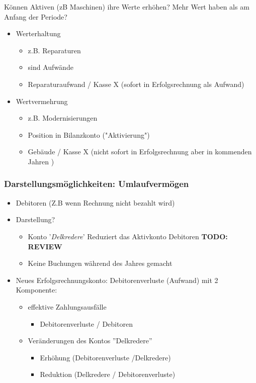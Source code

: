 Können Aktiven (zB Maschinen) ihre Werte erhöhen? Mehr Wert haben als am Anfang der Periode?
\begin{itemize}
    \item Werterhaltung
    \begin{itemize}
        \item z.B. Reparaturen
        \item sind Aufwände
        \item Reparaturaufwand / Kasse X (sofort in Erfolgsrechnung als Aufwand)
    \end{itemize}
    \item Wertvermehrung
    \begin{itemize}
        \item z.B. Modernisierungen
        \item Position in Bilanzkonto ("Aktivierung")
        \item Gebäude / Kasse X (nicht sofort in Erfolgsrechnung aber in kommenden Jahren )
    \end{itemize}
\end{itemize}

\subsubsection{Darstellungsmöglichkeiten: Umlaufvermögen}
\begin{itemize}
    \item Debitoren (Z.B wenn Rechnung nicht bezahlt wird)
    \item Darstellung?
    \begin{itemize}
        \item Konto '\textit{Delkredere}' Reduziert das Aktivkonto Debitoren \textbf{TODO: REVIEW}
        \item Keine Buchungen während des Jahres gemacht
    \end{itemize}
    \item Neues Erfolgsrechnungskonto: Debitorenverluste (Aufwand) mit 2 Komponente:
    \begin{itemize}
        \item effektive Zahlungsausfälle
        \begin{itemize}
            \item Debitorenverluste / Debitoren
        \end{itemize}
        \item Veränderungen des Kontos ''Delkredere''
        \begin{itemize}
            \item Erhöhung (Debitorenverluste /Delkredere)
            \item Reduktion (Delkredere / Debitorenverluste)
        \end{itemize}
    \end{itemize}
\end{itemize}
